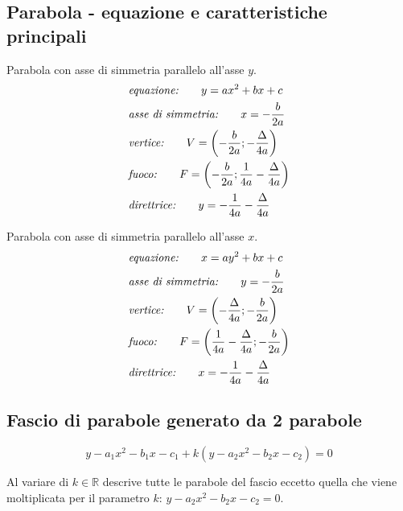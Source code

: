 \documentclass{article}
\begin{document}
  \subsection*{Parabola - equazione e caratteristiche principali}
  \begin{minipage}[t]{.45\textwidth}
    Parabola con asse di simmetria parallelo all'asse $y$.
    \begin{align*}
      & \text{\textit{equazione:}} \qquad
      y = ax^2 + bx + c \\
      & \text{\textit{asse di simmetria:}} \qquad
      x = -\frac{b}{2a} \\
      & \text{\textit{vertice:}} \qquad
      V = \left(-\frac{b}{2a}; -\frac{\Delta}{4a}\right) \\
      & \text{\textit{fuoco:}} \qquad
      F = \left(-\frac{b}{2a}; \frac{1}{4a} -\frac{\Delta}{4a}\right) \\
      & \text{\textit{direttrice:}} \qquad
      y = -\frac{1}{4a} -\frac{\Delta}{4a}
    \end{align*}
  \end{minipage}
  \hfill
  \begin{minipage}[t]{.45\textwidth}
    Parabola con asse di simmetria parallelo all'asse $x$.
    \begin{align*}
      & \text{\textit{equazione:}} \qquad
      x = ay^2 + bx + c \\
      & \text{\textit{asse di simmetria:}} \qquad
      y = -\frac{b}{2a} \\
      & \text{\textit{vertice:}} \qquad
      V = \left(-\frac{\Delta}{4a}; -\frac{b}{2a}\right) \\
      & \text{\textit{fuoco:}} \qquad
      F = \left(\frac{1}{4a} -\frac{\Delta}{4a}; -\frac{b}{2a}\right) \\
      & \text{\textit{direttrice:}} \qquad
      x = -\frac{1}{4a} -\frac{\Delta}{4a}
    \end{align*}
  \end{minipage}

  \subsection*{Fascio di parabole generato da 2 parabole}
  \begin{equation}
    y -a_1x^2 -b_1x -c_1 +k(y -a_2x^2 -b_2x -c_2) = 0
  \end{equation}

  Al variare di $k \in \mathbb{R}$ descrive tutte le parabole del fascio eccetto quella che viene moltiplicata per il parametro $k$: $y - a_2x^2 -b_2x -c_2 = 0$.
\end{document}
